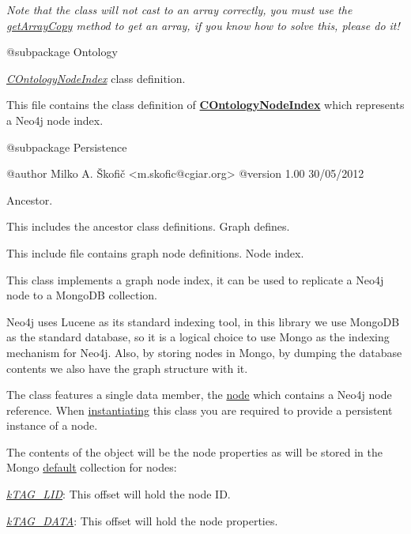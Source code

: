 {\itshape Note that the class will not cast to an array correctly, you must use the \hyperlink{}{get\-Array\-Copy} method to get an array, if you know how to solve this, please do it!}

\begin{DoxyVerb} @subpackage        Ontology\end{DoxyVerb}


{\itshape \hyperlink{class_c_ontology_node_index}{C\-Ontology\-Node\-Index}} class definition.

This file contains the class definition of {\bfseries \hyperlink{class_c_ontology_node_index}{C\-Ontology\-Node\-Index}} which represents a Neo4j node index.

\begin{DoxyVerb} @subpackage        Persistence

 @author            Milko A. Škofič <m.skofic@cgiar.org>
 @version   1.00 30/05/2012\end{DoxyVerb}


Ancestor.

This includes the ancestor class definitions. Graph defines.

This include file contains graph node definitions. Node index.

This class implements a graph node index, it can be used to replicate a Neo4j node to a Mongo\-D\-B collection.

Neo4j uses Lucene as its standard indexing tool, in this library we use Mongo\-D\-B as the standard database, so it is a logical choice to use Mongo as the indexing mechanism for Neo4j. Also, by storing nodes in Mongo, by dumping the database contents we also have the graph structure with it.

The class features a single data member, the \hyperlink{}{node} which contains a Neo4j node reference. When \hyperlink{}{instantiating} this class you are required to provide a persistent instance of a node.

The contents of the object will be the node properties as will be stored in the Mongo \hyperlink{}{default} collection for nodes\-:


\begin{DoxyItemize}
\item {\itshape \hyperlink{}{k\-T\-A\-G\-\_\-\-L\-I\-D}}\-: This offset will hold the node I\-D. 
\item {\itshape \hyperlink{}{k\-T\-A\-G\-\_\-\-D\-A\-T\-A}}\-: This offset will hold the node properties. 
\end{DoxyItemize}

